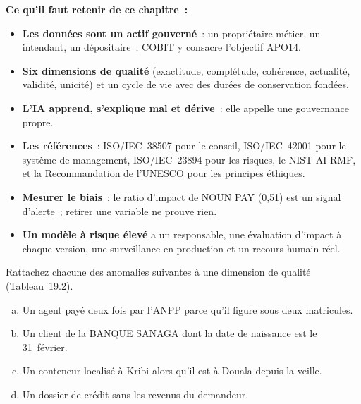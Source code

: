 \separateur

\begin{boxresume}
\textbf{Ce qu'il faut retenir de ce chapitre~:}
\begin{itemize}
    \item \textbf{Les données sont un actif gouverné}~: un propriétaire
          métier, un intendant, un dépositaire~; COBIT y consacre
          l'objectif APO14.
    \item \textbf{Six dimensions de qualité} (exactitude, complétude,
          cohérence, actualité, validité, unicité) et un cycle de vie avec
          des durées de conservation fondées.
    \item \textbf{L'IA apprend, s'explique mal et dérive}~: elle appelle une
          gouvernance propre.
    \item \textbf{Les références}~: ISO/IEC~38507 pour le conseil,
          ISO/IEC~42001 pour le système de management, ISO/IEC~23894 pour
          les risques, le NIST AI RMF, et la Recommandation de l'UNESCO
          pour les principes éthiques.
    \item \textbf{Mesurer le biais}~: le ratio d'impact de NOUN PAY (0,51)
          est un signal d'alerte~; retirer une variable ne prouve rien.
    \item \textbf{Un modèle à risque élevé} a un responsable, une évaluation
          d'impact à chaque version, une surveillance en production et un
          recours humain réel.
\end{itemize}
\end{boxresume}

\bigskip

\begin{boxexo}[title={\ding{45}\quad Exercice~19.1. Quelle dimension de qualité~? \niveaubase}]
Rattachez chacune des anomalies suivantes à une dimension de qualité
(Tableau~19.2).
\begin{enumerate}[(a)]
    \item Un agent payé deux fois par l'ANPP parce qu'il figure sous deux
          matricules.
    \item Un client de la BANQUE SANAGA dont la date de naissance est le
          31~février.
    \item Un conteneur localisé à Kribi alors qu'il est à Douala depuis la
          veille.
    \item Un dossier de crédit sans les revenus du demandeur.
\end{enumerate}
\end{boxexo}

